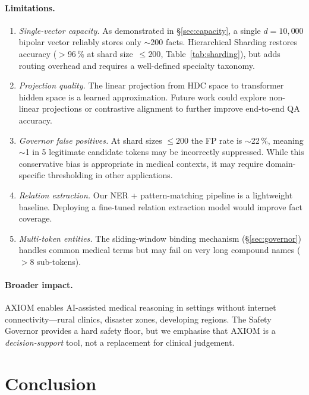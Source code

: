 \documentclass[11pt,a4paper]{article}
\begin{document}
\paragraph{Limitations.}
\begin{enumerate}[nosep]
    \item \emph{Single-vector capacity.}  As demonstrated in
          \S\ref{sec:capacity}, a single $d = 10{,}000$ bipolar
          vector reliably stores only $\sim$200 facts.  Hierarchical
          Sharding restores accuracy ($>$96\,\% at shard size~$\leq 200$,
          Table~\ref{tab:sharding}), but adds routing overhead and
          requires a well-defined specialty taxonomy.
    \item \emph{Projection quality.}  The linear projection from HDC
          space to transformer hidden space is a learned approximation.
          Future work could explore non-linear projections or contrastive
          alignment to further improve end-to-end QA accuracy.
    \item \emph{Governor false positives.}  At shard sizes $\leq 200$
          the FP rate is $\sim$22\,\%, meaning $\sim$1 in 5 legitimate
          candidate tokens may be incorrectly suppressed.  While this
          conservative bias is appropriate in medical contexts, it may
          require domain-specific thresholding in other applications.
    \item \emph{Relation extraction.}  Our NER + pattern-matching
          pipeline is a lightweight baseline.  Deploying a fine-tuned
          relation extraction model would improve fact coverage.
    \item \emph{Multi-token entities.}  The sliding-window binding
          mechanism (\S\ref{sec:governor}) handles common medical terms
          but may fail on very long compound names ($>$8 sub-tokens).
\end{enumerate}

\paragraph{Broader impact.}
AXIOM enables AI-assisted medical reasoning in settings without internet
connectivity---rural clinics, disaster zones, developing regions.  The
Safety Governor provides a hard safety floor, but we emphasise that
AXIOM is a \emph{decision-support} tool, not a replacement for clinical
judgement.

\section{Conclusion}
\label{sec:conclusion}
\end{document}
